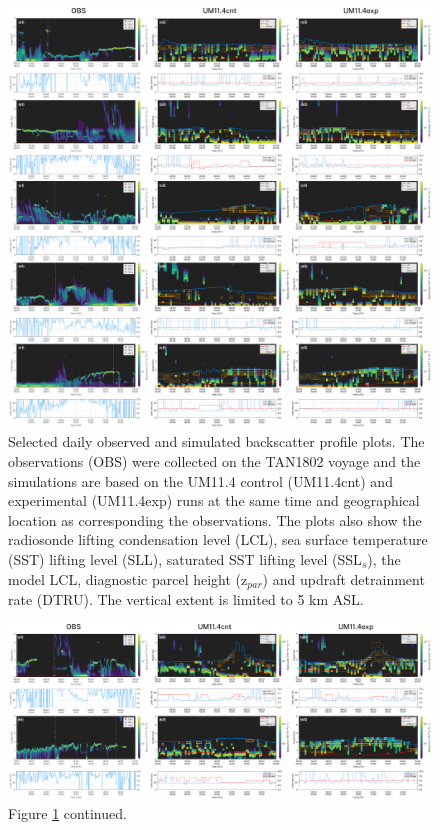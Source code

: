 \begin{figure}[p]
\centering
\includegraphics[width=\textwidth]{chapter4/fig/examples.pdf}
\caption[Selected daily observed and simulated backscatter profile plots]{Selected daily observed and simulated backscatter profile plots.
The observations (OBS) were collected on the TAN1802 voyage and the
simulations are based on the UM11.4 control (UM11.4cnt) and experimental (UM11.4exp) runs
at the same time and geographical location as corresponding the observations.
The plots also show the radiosonde lifting condensation level (LCL), sea surface temperature (SST) lifting level (SLL), saturated SST lifting level (SSL$_s$), the model LCL, diagnostic parcel height (z$_{par}$) and
updraft detrainment rate (DTRU). The vertical extent is limited to 5 km ASL.
}
\label{fig:4:examples}
\end{figure}

\begin{figure}[t]
\centering
\includegraphics[width=\textwidth]{chapter4/fig/examples_cont.pdf}
\caption{Figure \ref{fig:4:examples} continued.
}
\label{fig:4:examples-cont}
\end{figure}

